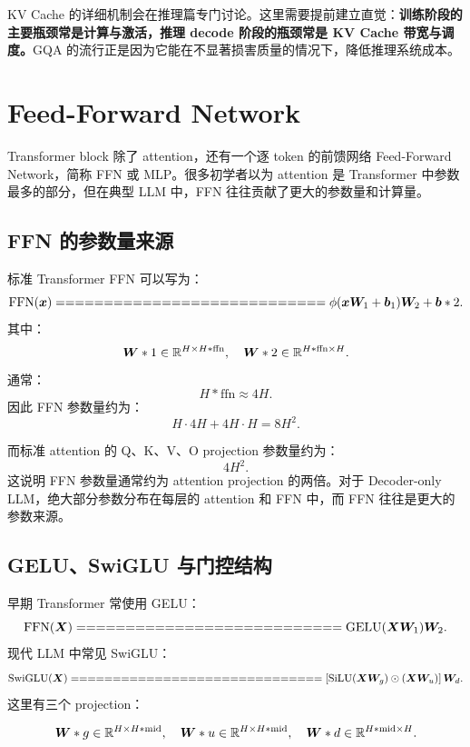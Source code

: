 KV Cache 的详细机制会在推理篇专门讨论。这里需要提前建立直觉：\textbf{训练阶段的主要瓶颈常是计算与激活，推理 decode 阶段的瓶颈常是 KV Cache 带宽与调度。}GQA 的流行正是因为它能在不显著损害质量的情况下，降低推理系统成本。

\section{Feed-Forward Network}
\label{sec:feed-forward-network}

Transformer block 除了 attention，还有一个逐 token 的前馈网络 Feed-Forward Network，简称 FFN 或 MLP。很多初学者以为 attention 是 Transformer 中参数最多的部分，但在典型 LLM 中，FFN 往往贡献了更大的参数量和计算量。

\subsection{FFN 的参数量来源}
\label{subsec:ffn-parameter-source}

标准 Transformer FFN 可以写为：
\[
\operatorname{FFN}(\vect{x})
============================

\phi(\vect{x}\mat{W}_1+\vect{b}_1)\mat{W}_2+\vect{b}*2.
\]
其中：
\[
\bm{W}*1\in\mathbb{R}^{H\times H*{\mathrm{ffn}}},
\quad
\bm{W}*2\in\mathbb{R}^{H*{\mathrm{ffn}}\times H}.
\]
通常：
\[
H*{\mathrm{ffn}}\approx 4H.
\]
因此 FFN 参数量约为：
\[
H\cdot 4H+4H\cdot H=8H^2.
\]

而标准 attention 的 Q、K、V、O projection 参数量约为：
\[
4H^2.
\]
这说明 FFN 参数量通常约为 attention projection 的两倍。对于 Decoder-only LLM，绝大部分参数分布在每层的 attention 和 FFN 中，而 FFN 往往是更大的参数来源。

\subsection{GELU、SwiGLU 与门控结构}
\label{subsec:gelu-swiglu-gated-ffn}

早期 Transformer 常使用 GELU：
\[
\operatorname{FFN}(\mat{X})
===========================

\operatorname{GELU}(\mat{X}\mat{W}_1)\mat{W}_2.
\]
现代 LLM 中常见 SwiGLU：
\[
\operatorname{SwiGLU}(\mat{X})
==============================

\left[
\operatorname{SiLU}(\mat{X}\mat{W}_g)
\odot
(\mat{X}\mat{W}_u)
\right]\mat{W}_d.
\]
这里有三个 projection：

\[
\bm{W}*g\in\mathbb{R}^{H\times H*{\mathrm{mid}}},
\quad
\bm{W}*u\in\mathbb{R}^{H\times H*{\mathrm{mid}}},
\quad
\bm{W}*d\in\mathbb{R}^{H*{\mathrm{mid}}\times H}.
\]

